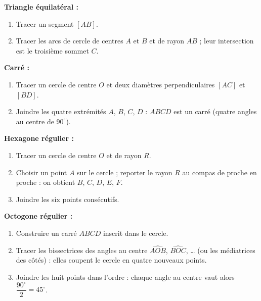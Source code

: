 \documentclass[11pt]{article}
\begin{document}
\begin{methode}
\textbf{Triangle équilatéral :}
\begin{enumerate}
\item Tracer un segment $[AB]$.
\item Tracer les arcs de cercle de centres $A$ et $B$ et de rayon $AB$ ; leur intersection est le troisième sommet $C$.
\end{enumerate}
\textbf{Carré :}
\begin{enumerate}
\item Tracer un cercle de centre $O$ et deux diamètres perpendiculaires $[AC]$ et $[BD]$.
\item Joindre les quatre extrémités $A$, $B$, $C$, $D$ : $ABCD$ est un carré (quatre angles au centre de $90^\circ$).
\end{enumerate}
\textbf{Hexagone régulier :}
\begin{enumerate}
\item Tracer un cercle de centre $O$ et de rayon $R$.
\item Choisir un point $A$ sur le cercle ; reporter le rayon $R$ au compas de proche en proche : on obtient $B$, $C$, $D$, $E$, $F$.
\item Joindre les six points consécutifs.
\end{enumerate}
\textbf{Octogone régulier :}
\begin{enumerate}
\item Construire un carré $ABCD$ inscrit dans le cercle.
\item Tracer les bissectrices des angles au centre $\widehat{AOB}$, $\widehat{BOC}$, \ldots{} (ou les médiatrices des côtés) : elles coupent le cercle en quatre nouveaux points.
\item Joindre les huit points dans l'ordre : chaque angle au centre vaut alors $\dfrac{90^\circ}{2} = 45^\circ$.
\end{enumerate}
\end{methode}
\end{document}
